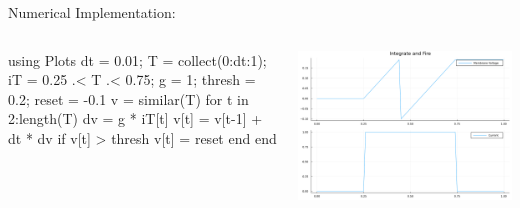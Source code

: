 \documentclass[
  ignorenonframetext,
]{beamer}
\newenvironment{Shaded}{\begin{snugshade}}{\end{snugshade}}
\newcommand{\BuiltInTok}[1]{\textcolor[rgb]{0.00,0.23,0.31}{#1}}
\newcommand{\ControlFlowTok}[1]{\textcolor[rgb]{0.00,0.23,0.31}{#1}}
\newcommand{\FloatTok}[1]{\textcolor[rgb]{0.68,0.00,0.00}{#1}}
\newcommand{\FunctionTok}[1]{\textcolor[rgb]{0.28,0.35,0.67}{#1}}
\newcommand{\ImportTok}[1]{\textcolor[rgb]{0.00,0.46,0.62}{#1}}
\newcommand{\KeywordTok}[1]{\textcolor[rgb]{0.00,0.23,0.31}{#1}}
\newcommand{\NormalTok}[1]{\textcolor[rgb]{0.00,0.23,0.31}{#1}}
\newcommand{\OperatorTok}[1]{\textcolor[rgb]{0.37,0.37,0.37}{#1}}
\begin{document}
\begin{frame}[fragile]{Numerical Implementation:}
\protect\hypertarget{numerical-implementation}{}
\begin{columns}[T]
\begin{column}{0.5\textwidth}
\begin{Shaded}
\begin{Highlighting}[]
\ImportTok{using} \BuiltInTok{Plots}
\NormalTok{dt }\OperatorTok{=} \FloatTok{0.01}\NormalTok{; T }\OperatorTok{=} \FunctionTok{collect}\NormalTok{(}\FloatTok{0}\OperatorTok{:}\NormalTok{dt}\OperatorTok{:}\FloatTok{1}\NormalTok{);}
\NormalTok{iT }\OperatorTok{=} \FloatTok{0.25} \OperatorTok{.\textless{}}\NormalTok{ T }\OperatorTok{.\textless{}} \FloatTok{0.75}\NormalTok{;}
\NormalTok{ g }\OperatorTok{=} \FloatTok{1}\NormalTok{; thresh }\OperatorTok{=} \FloatTok{0.2}\NormalTok{; reset }\OperatorTok{=} \OperatorTok{{-}}\FloatTok{0.1}
\NormalTok{v }\OperatorTok{=} \FunctionTok{similar}\NormalTok{(T)}
\ControlFlowTok{for}\NormalTok{ t }\KeywordTok{in} \FloatTok{2}\OperatorTok{:}\FunctionTok{length}\NormalTok{(T)}
\NormalTok{    dv }\OperatorTok{=}\NormalTok{ g }\OperatorTok{*}\NormalTok{ iT[t]}
\NormalTok{    v[t] }\OperatorTok{=}\NormalTok{ v[t}\OperatorTok{{-}}\FloatTok{1}\NormalTok{] }\OperatorTok{+}\NormalTok{ dt }\OperatorTok{*}\NormalTok{ dv}
    \ControlFlowTok{if}\NormalTok{ v[t] }\OperatorTok{\textgreater{}}\NormalTok{ thresh}
\NormalTok{        v[t] }\OperatorTok{=}\NormalTok{ reset}
    \ControlFlowTok{end}
\ControlFlowTok{end}
\end{Highlighting}
\end{Shaded}
\end{column}

\begin{column}{0.5\textwidth}
\includegraphics{lecture2_files/figure-beamer/cell-3-output-1.pdf}
\end{column}
\end{columns}
\end{frame}
\end{document}
